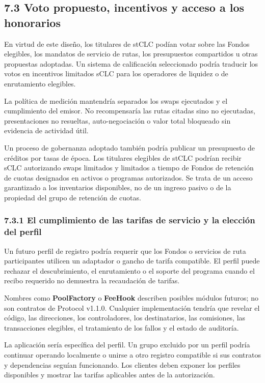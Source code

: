 \documentclass[11pt]{article}
\begin{document}
\subsection*{7.3 Voto propuesto, incentivos y acceso a los honorarios}

En virtud de este diseño, los titulares de stCLC podían votar sobre las Fondos elegibles, los mandatos de servicio de rutas, los presupuestos compartidos u otras propuestas adoptadas. Un sistema de calificación seleccionado podría traducir los votos en incentivos limitados sCLC para los operadores de liquidez o de enrutamiento elegibles.

La política de medición mantendría separados los swaps ejecutados y el cumplimiento del emisor. No recompensaría las rutas citadas sino no ejecutadas, presentaciones no resueltas, auto-negociación o valor total bloqueado sin evidencia de actividad útil.

Un proceso de gobernanza adoptado también podría publicar un presupuesto de créditos por tasas de época. Los titulares elegibles de stCLC podrían recibir sCLC autorizando swaps limitados y limitados a tiempo de Fondos de retención de cuotas designados en activos o programas autorizados. Se trata de un acceso garantizado a los inventarios disponibles, no de un ingreso pasivo o de la propiedad del grupo de retención de cuotas.

\subsubsection*{7.3.1 El cumplimiento de las tarifas de servicio y la elección del perfil}

Un futuro perfil de registro podría requerir que los Fondos o servicios de ruta participantes utilicen un adaptador o gancho de tarifa compatible. El perfil puede rechazar el descubrimiento, el enrutamiento o el soporte del programa cuando el recibo requerido no demuestra la recaudación de tarifas.

Nombres como \textbf{PoolFactory} o \textbf{FeeHook} describen posibles módulos futuros; no son contratos de Protocol v1.1.0. Cualquier implementación tendría que revelar el código, las direcciones, los controladores, los destinatarios, las comisiones, las transacciones elegibles, el tratamiento de los fallos y el estado de auditoría.

La aplicación sería específica del perfil. Un grupo excluido por un perfil podría continuar operando localmente o unirse a otro registro compatible si sus contratos y dependencias seguían funcionando. Los clientes deben exponer los perfiles disponibles y mostrar las tarifas aplicables antes de la autorización.
\end{document}
